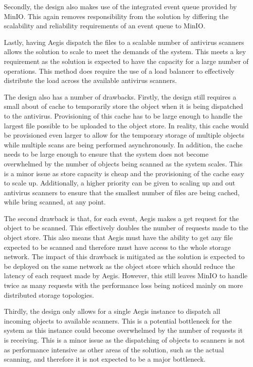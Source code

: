 \documentclass[12pt, conference, final, a4paper, onecolumn, compsoc]{IEEEtran}
\begin{document}
Secondly, the design also makes use of the integrated event queue provided by
MinIO. This again removes responsibility from the solution by differing the
scalability and reliability requirements of an event queue to MinIO.


Lastly, having Aegis dispatch the files to a scalable number of antivirus
scanners allows the solution to scale to meet the demands of the system. This
meets a key requirement as the solution is expected to have the capacity for a
large number of operations. This method does require the use of a load balancer
to effectively distribute the load across the available antivirus scanners.

The design also has a number of drawbacks. Firstly, the design still requires a
small about of cache to temporarily store the object when it is being dispatched
to the antivirus. Provisioning of this cache has to be large enough to handle
the largest file possible to be uploaded to the object store. In reality, this
cache would be provisioned even larger to allow for the temporary storage of
multiple objects while multiple scans are being performed asynchronously. In
addition, the cache needs to be large enough to ensure that the system does not
become overwhelmed by the number of objects being scanned as the system scales.
This is a minor issue as store capacity is cheap and the provisioning of the
cache easy to scale up. Additionally, a higher priority can be given to scaling
up and out antivirus scanners to ensure that the smallest number of files are
being cached, while bring scanned, at any point.


The second drawback is that, for each event, Aegis makes a get request for the
object to be scanned. This effectively doubles the number of requests made to
the object store. This also means that Aegis must have the ability to get any
file expected to be scanned and therefore must have access to the whole storage
network. The impact of this drawback is mitigated as the solution is expected to
be deployed on the same network as the object store which should reduce the
latency of each request made by Aegis. However, this still leaves MinIO to
handle twice as many requests with the performance loss being noticed mainly on
more distributed storage topologies.

Thirdly, the design only allows for a single Aegis instance to dispatch all
incoming objects to available scanners. This is a potential bottleneck for the
system as this instance could become overwhelmed by the number of requests it is
receiving. This is a minor issue as the dispatching of objects to scanners is
not as performance intensive as other areas of the solution, such as the actual
scanning, and therefore it is not expected to be a major bottleneck.
\end{document}
